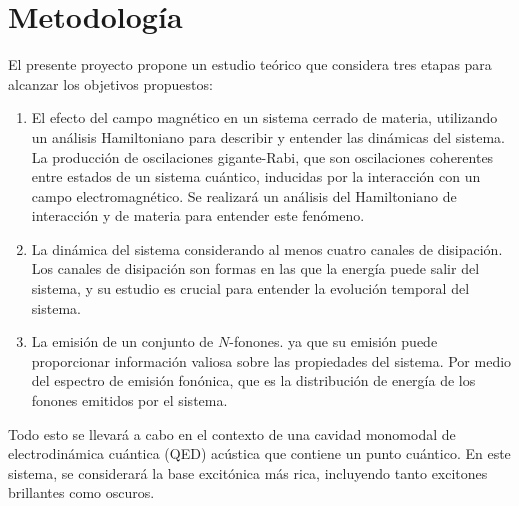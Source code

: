 \documentclass[main.tex]{subfiles}
\begin{document}
\section{Metodología}
El presente proyecto propone un estudio te\'orico que considera tres etapas para alcanzar los
objetivos propuestos:
\begin{enumerate}
	\item El efecto del campo magnético en un sistema cerrado de materia, utilizando un análisis Hamiltoniano para describir y entender las dinámicas del sistema. La producción de oscilaciones gigante-Rabi, que son oscilaciones coherentes entre estados de un sistema cuántico, inducidas por la interacción con un campo electromagnético. Se realizará un análisis del Hamiltoniano de interacción y de materia para entender este fenómeno.
	\item La dinámica del sistema considerando al menos cuatro canales de disipación. Los canales de disipación son formas en las que la energía puede salir del sistema, y su estudio es crucial para entender la evolución temporal del sistema.
	\item La emisión de un conjunto de $N$-fonones. ya que su emisión puede proporcionar información valiosa sobre las propiedades del sistema. Por medio del espectro de emisión fonónica, que es la distribución de energía de los fonones emitidos por el sistema.
\end{enumerate}

Todo esto se llevará a cabo en el contexto de una cavidad monomodal de electrodinámica cuántica (QED) acústica que contiene un punto cuántico. En este sistema, se considerará la base excitónica más rica, incluyendo tanto excitones brillantes como oscuros.
%
\end{document}
